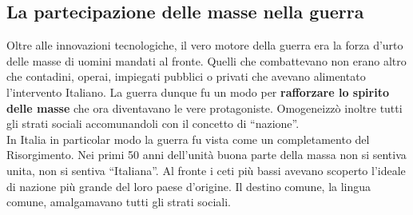 \subsection{La partecipazione delle masse nella guerra}
Oltre alle innovazioni tecnologiche, il vero motore della guerra era la forza d'urto delle masse
di uomini mandati al fronte. Quelli che combattevano non erano altro che contadini, operai, impiegati
pubblici o privati che avevano alimentato l'intervento Italiano. La guerra dunque fu un modo per
\textbf{rafforzare lo spirito delle masse} che ora diventavano le vere protagoniste. Omogeneizzò
inoltre tutti gli strati sociali accomunandoli con il concetto di ``nazione''.\\
In Italia in particolar modo la guerra fu vista come un completamento del Risorgimento. Nei primi
50 anni dell'unità buona parte della massa non si sentiva unita, non si sentiva ``Italiana''.
Al fronte i ceti più bassi avevano scoperto l'ideale di nazione più grande del loro paese d'origine.
Il destino comune, la lingua comune, amalgamavano tutti gli strati sociali.

